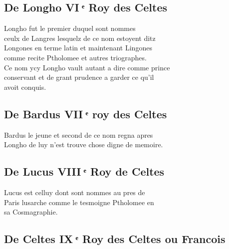 \documentclass[12pt]{article}
\begin{document}
\subsection*{De Longho VI ͤ Roy des Celtes}


Longho fut le premier duquel sont nommes\\
ceulx de Langres lesquelz de ce nom estoyent ditz\\
Longones en terme
          latin et maintenant Lingones\\
comme recite Ptholomee et autres triographes.\\
Ce nom ycy Longho vault autant a dire comme
            prince\\
conservant et de grant prudence a garder ce qu'il\\
avoit
          conquis.





\subsection*{De Bardus VII ͤ roy des Celtes}










\newpage




Bardus le jeune et second de ce nom
          regna apres\\
Longho de luy n'est trouve chose
          digne de memoire.





\subsection*{De Lucus VIII ͤ Roy de
          Celtes}


Lucus est celluy dont sont nommes au pres
            de\\
Paris lusarche comme le tesmoigne Ptholomee en\\
sa Cosmagraphie.





\subsection*{De Celtes IX ͤ Roy des
          Celtes ou Francois}
\end{document}
